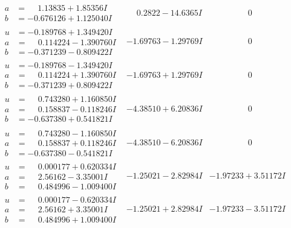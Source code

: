 \documentclass[1p]{elsarticle_modified}
\theoremstyle{definition}
\begin{document}
$$\begin{array}{c|c|c}
\begin{aligned}
a &= \phantom{-}1.13835 + 1.85356 I \\
b &= -0.676126 + 1.125040 I\end{aligned}
 & \phantom{-}0.2822 - 14.6365 I & \phantom{-0.000000 } 0 \\ \hline\begin{aligned}
u &= -0.189768 + 1.349420 I \\
a &= \phantom{-}0.114224 - 1.390760 I \\
b &= -0.371239 - 0.809422 I\end{aligned}
 & -1.69763 - 1.29769 I & \phantom{-0.000000 } 0 \\ \hline\begin{aligned}
u &= -0.189768 - 1.349420 I \\
a &= \phantom{-}0.114224 + 1.390760 I \\
b &= -0.371239 + 0.809422 I\end{aligned}
 & -1.69763 + 1.29769 I & \phantom{-0.000000 } 0 \\ \hline\begin{aligned}
u &= \phantom{-}0.743280 + 1.160850 I \\
a &= \phantom{-}0.158837 - 0.118246 I \\
b &= -0.637380 + 0.541821 I\end{aligned}
 & -4.38510 + 6.20836 I & \phantom{-0.000000 } 0 \\ \hline\begin{aligned}
u &= \phantom{-}0.743280 - 1.160850 I \\
a &= \phantom{-}0.158837 + 0.118246 I \\
b &= -0.637380 - 0.541821 I\end{aligned}
 & -4.38510 - 6.20836 I & \phantom{-0.000000 } 0 \\ \hline\begin{aligned}
u &= \phantom{-}0.000177 + 0.620334 I \\
a &= \phantom{-}2.56162 - 3.35001 I \\
b &= \phantom{-}0.484996 - 1.009400 I\end{aligned}
 & -1.25021 - 2.82984 I & -1.97233 + 3.51172 I \\ \hline\begin{aligned}
u &= \phantom{-}0.000177 - 0.620334 I \\
a &= \phantom{-}2.56162 + 3.35001 I \\
b &= \phantom{-}0.484996 + 1.009400 I\end{aligned}
 & -1.25021 + 2.82984 I & -1.97233 - 3.51172 I \\ \hline\begin{aligned}

\end{aligned}
\end{array}$$
\end{document}
